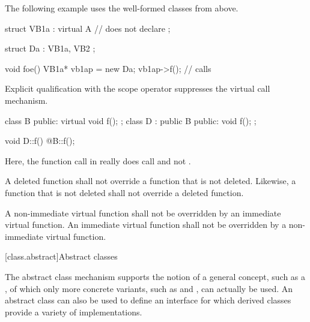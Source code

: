 \pnum
\begin{example}
The following example uses the well-formed classes from above.
\begin{codeblock}
struct VB1a : virtual A {       // does not declare 
};

struct Da : VB1a, VB2 {
};

void foe() {
  VB1a*  vb1ap = new Da;
  vb1ap->f();                   // calls 
}
\end{codeblock}
\end{example}

\pnum
{}%
%
Explicit qualification with the scope operator
suppresses the virtual call mechanism.
\begin{example}
\begin{codeblock}
class B { public: virtual void f(); };
class D : public B { public: void f(); };

void D::f() { @\commentellip@ B::f(); }
\end{codeblock}

Here, the function call in
really does call
and not
.
\end{example}

\pnum
A deleted function shall
not override a function that is not deleted. Likewise,
a function that is not deleted shall not override a
deleted function.%

\pnum
A non-immediate virtual function shall not be overridden by an immediate virtual function.
An immediate virtual function shall not be overridden by
a non-immediate virtual function.

[class.abstract]{Abstract classes}%

\pnum
\begin{note}
The abstract class mechanism supports the notion of a general concept,
such as a , of which only more concrete variants, such as
 and , can actually be used. An abstract
class can also be used to define an interface for which derived classes
provide a variety of implementations.
\end{note}

